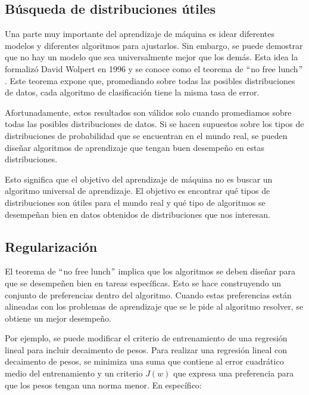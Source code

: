 \subsection{Búsqueda de distribuciones útiles}
Una parte muy importante del aprendizaje de máquina es idear diferentes modelos y diferentes algoritmos para ajustarlos. Sin embargo, se puede demostrar que no hay un modelo que sea universalmente mejor que los demás. Esta idea la formalizó David Wolpert en 1996 y se conoce como el teorema de $``$no free lunch$"$. Este teorema expone que, promediando sobre todas las posibles distribuciones de datos, cada algoritmo de clasificación tiene la misma tasa de error. 
\cite{Murphy:2012:MLP:2380985}
\cite{wolpert}

\vspace{1em}

Afortunadamente, estos resultados son válidos solo cuando promediamos sobre todas las posibles distribuciones de datos. Si se hacen supuestos sobre los tipos de distribuciones de probabilidad que se encuentran en el mundo real, se pueden diseñar algoritmos de aprendizaje que tengan buen desempeño en estas distribuciones.

\vspace{1em}

Esto significa que el objetivo del aprendizaje de máquina no es buscar un algoritmo universal de aprendizaje. El objetivo es encontrar qué tipos de distribuciones son útiles para el mundo real y qué tipo de algoritmos se desempeñan bien en datos obtenidos de distribuciones que nos interesan.
\cite{goodfellow-et-al-2016}

\subsection{Regularización}
El teorema de $``$no free lunch$"$ implica que los algoritmos se deben diseñar para que se desempeñen bien en tareas específicas. Esto se hace construyendo un conjunto de preferencias dentro del algoritmo. Cuando estas preferencias están alineadas con los problemas de aprendizaje que se le pide al algoritmo resolver, se obtiene un mejor desempeño.
\cite{goodfellow-et-al-2016}

\vspace{1em}

Por ejemplo, se puede modificar el criterio de entrenamiento de una regresión lineal para incluir decaimento de pesos. Para realizar una regresión lineal con decaimento de pesos, se minimiza una suma que contiene al error cuadrático medio del entrenamiento y un criterio $J(w)$ que expresa una preferencia para que los pesos tengan una norma menor. En específico: 

